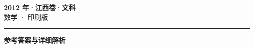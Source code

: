 \documentclass[zihao=5, a4paper]{ctexart}
\begin{document}
\begin{center}
  {\Large\bfseries 2012 年·江西卷·文科}\\[4pt]
  {\large 数学 · 印刷版}
\end{center}
\medskip
{}

\par\bigskip\hrule\bigskip
{}
\Needspace{0.55\textheight}
\begin{center}{\large\bfseries 参考答案与详细解析}\end{center}
\smallskip

\end{document}
